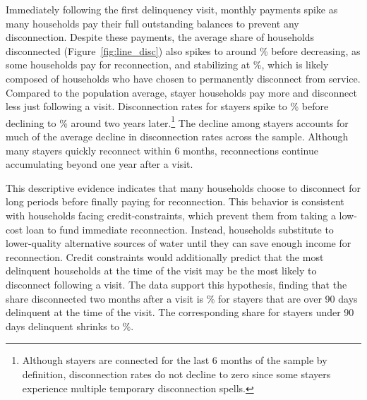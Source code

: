 \documentclass[12pt]{article}
\begin{document}
Immediately following the first delinquency visit, monthly payments spike as many households pay their full outstanding balances to prevent any disconnection.  Despite these payments, the average share of households disconnected (Figure~\ref{fig:line_disc}) also spikes to around \unskip\% before decreasing, as some households pay for reconnection, and stabilizing at \unskip\%, which is likely composed of households who have chosen to permanently disconnect from service.  Compared to the population average, stayer households pay more and disconnect less just following a visit.  Disconnection rates for stayers spike to \unskip\% before declining to \unskip\% around two years later.\footnote{Although stayers are connected for the last 6 months of the sample by definition, disconnection rates do not decline to zero since some stayers experience multiple temporary disconnection spells.}  The decline among stayers accounts for much of the average decline in disconnection rates across the sample.  Although many stayers quickly reconnect within 6 months, reconnections continue accumulating beyond one year after a visit.  

This descriptive evidence indicates that many households choose to disconnect for long periods before finally paying for reconnection.  This behavior is consistent with households facing credit-constraints, which prevent them from taking a low-cost loan to fund immediate reconnection.  Instead, households substitute to lower-quality alternative sources of water until they can save enough income for reconnection.  Credit constraints would additionally predict that the most delinquent households at the time of the visit may be the most likely to disconnect following a visit.  The data support this hypothesis, finding that the share disconnected two months after a visit is \unskip\% for stayers that are over 90 days delinquent at the time of the visit.  The corresponding share for stayers under 90 days delinquent shrinks to \unskip\%.
\end{document}
